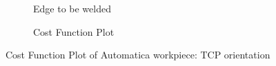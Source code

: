 \begin{figure}[!htbp] %
	\centering
	\begin{subfigure}[b]{0.4\textwidth}
		\caption{Edge to be welded}  
		\label{fig:cp3b}
	\end{subfigure}
	\begin{subfigure}[b]{0.4\textwidth}
		\caption{Cost Function Plot}  
		\label{fig:cp3a}
	\end{subfigure}	
	\caption{Cost Function Plot of Automatica workpiece: TCP orientation}
	\label{fig:cp3}
\end{figure}
